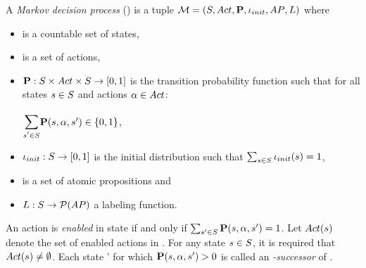 \documentclass[preview]{standalone}
\begin{document}

\begin{definition}
	A \emph{Markov decision process} (\mdpN) is a tuple ${{\mathcal{M}}} = {({S}, {Act}, {\textbf{P}}, {\iota_{init}}, {AP}, {L})}$ where
	\begin{itemize}
		\item \states is a countable set of states,
		\item \actions is a set of actions,
		\item ${\textbf{P}} : {S} \times {Act} \times {S} \to [0,1]$ is the transition probability function such that for all states ${s} \in {S}$ and actions ${\alpha} \in {Act}$:
		\begin{center}
			$\bbigsum{\state' \in \states}\probtfunc(\state,\action,\state') \in \{0,1\}$,
		\end{center}
		\item ${\iota_{init}} : {S} \to [0,1]$ is the initial distribution such that $\sum_{{s} \in {S}} {\iota_{init}}({s}) = 1$,
		\item \atomicprops is  a set of atomic propositions and
		\item ${L} : {S} \to {\mathcal{P}(\ensuremath{{AP}})}$ a labeling function.
	\end{itemize}
	An action \action is \emph{enabled} in state \state if and only if $\sum_{{s}' \in {S}} {\textbf{P}}({s},{\alpha},{s}') = 1$. Let ${Act}({s})$ denote the set of enabled actions in \state. For any state ${s} \in {S}$, it is required that ${Act}({s}) \neq \emptyset$. Each state \state' for which ${\textbf{P}}({s},{\alpha},{s}') > 0$ is called an \emph{\action-successor} of \state.
\end{definition}

\end{document}
